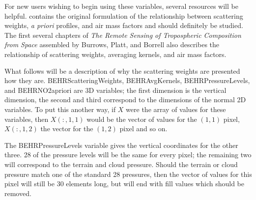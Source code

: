 \documentclass[12pt]{article}
\begin{document}
	For new users wishing to begin using these variables, several resources will be helpful. \citet{palmer2001} contains the original formulation of the relationship between scattering weights, \emph{a priori}  profiles, and air mass factors and should definitely be studied. The first several chapters of \emph{The Remote Sensing of Tropospheric Composition from Space} assembled by Burrows, Platt, and Borrell \citep{burrows-platt} also describes the relationship of scattering weights, averaging kernels, and air mass factors.
	
	What follows will be a description of why the scattering weights are presented how they are.  BEHRScatteringWeights, BEHRAvgKernels, BEHRPressureLevels, and BEHRNO2apriori are 3D variables; the first dimension is the vertical dimension, the second and third correspond to the dimensions of the normal 2D variables. To put this another way, if $X$ were the array of values for these variables, then $X(:,1,1)$ would be the vector of values for the $(1,1)$ pixel, $X(:,1,2)$ the vector for the $(1,2)$ pixel and so on.
	
	The BEHRPressureLevels variable gives the vertical coordinates for the other three.  28 of the pressure levels will be the same for every pixel; the remaining two will correspond to the terrain and cloud pressure. Should the terrain or cloud pressure match one of the standard 28 pressures, then the vector of values for this pixel will still be 30 elements long, but will end with fill values which should be removed.
	
\end{document}
